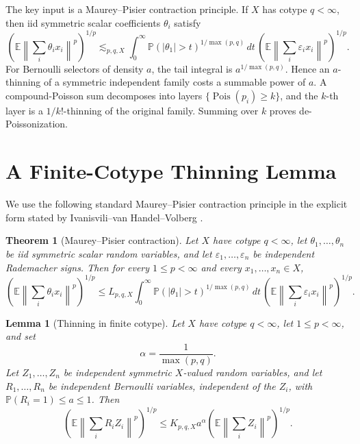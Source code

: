 \documentclass[11pt]{article}
\newtheorem{theorem}{Theorem}
\newtheorem{lemma}{Lemma}
\newcommand{\E}{\mathbb E}
\newcommand{\Pp}{\mathbb P}
\newcommand{\norm}[1]{\left\lVert #1\right\rVert}
\newcommand{\eps}{\varepsilon}
\newcommand{\1}{\mathbf 1}
\begin{document}
The key input is a Maurey--Pisier contraction principle.  If \(X\) has cotype
\(q<\infty\), then iid symmetric scalar coefficients \(\theta_i\) satisfy
\[
 \left(\E\norm{\sum_i\theta_i x_i}^p\right)^{1/p}
 \lesssim_{p,q,X}
 \int_0^\infty \Pp(|\theta_1|>t)^{1/\max(p,q)}\,dt\,
 \left(\E\norm{\sum_i\eps_i x_i}^p\right)^{1/p}.
\]
For Bernoulli selectors of density \(a\), the tail integral is
\(a^{1/\max(p,q)}\).  Hence an \(a\)-thinning of a symmetric independent
family costs a summable power of \(a\).  A compound-Poisson sum decomposes into
layers \(\{\operatorname{Pois}(p_i)\ge k\}\), and the \(k\)-th layer is a
\(1/k!\)-thinning of the original family.  Summing over \(k\) proves
de-Poissonization.

\section*{A Finite-Cotype Thinning Lemma}

We use the following standard Maurey--Pisier contraction principle in the
explicit form stated by Ivanisvili--van Handel--Volberg
\cite[Theorem 4.1]{IvanisviliVanHandelVolberg2020}.

\begin{theorem}[Maurey--Pisier contraction]
\label{thm:mp}
Let \(X\) have cotype \(q<\infty\), let
\(\theta_1,\ldots,\theta_n\) be iid symmetric scalar random variables, and let
\(\eps_1,\ldots,\eps_n\) be independent Rademacher signs.  Then for every
\(1\le p<\infty\) and every \(x_1,\ldots,x_n\in X\),
\[
  \left(\E\norm{\sum_i\theta_i x_i}^p\right)^{1/p}
  \le
  L_{p,q,X}
  \int_0^\infty \Pp(|\theta_1|>t)^{1/\max(p,q)}\,dt\,
  \left(\E\norm{\sum_i\eps_i x_i}^p\right)^{1/p}.
\]
\end{theorem}

\begin{lemma}[Thinning in finite cotype]
\label{lem:thinning}
Let \(X\) have cotype \(q<\infty\), let \(1\le p<\infty\), and set
\[
  \alpha=\frac{1}{\max(p,q)}.
\]
Let \(Z_1,\ldots,Z_n\) be independent symmetric \(X\)-valued random
variables, and let \(R_1,\ldots,R_n\) be independent Bernoulli variables,
independent of the \(Z_i\), with \(\Pp(R_i=1)\le a\le1\).  Then
\[
  \left(\E\norm{\sum_i R_iZ_i}^p\right)^{1/p}
  \le
  K_{p,q,X} a^\alpha
  \left(\E\norm{\sum_i Z_i}^p\right)^{1/p}.
\]
\end{lemma}
\end{document}
